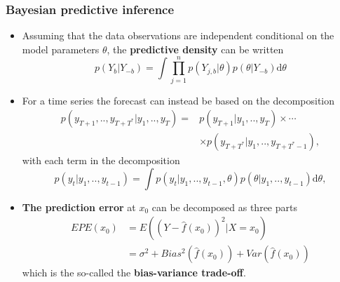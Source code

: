 \documentclass[10pt]{beamer}
\begin{document}
\begin{frame}
  \frametitle{Bayesian predictive inference}
  \begin{itemize}
  \item Assuming that the data observations are independent conditional on the
    model parameters $\theta$, the \textbf{predictive density} can be written
\[
p(Y_{b}|Y_{-b})=\int\prod_{j=1}^{n}p(Y_{j,b}|\theta)p(\theta|Y_{-b})\mathrm{d}\theta
\]

\item For a time series the forecast can instead be based on the
  decomposition
  \[
  \begin{split}
    p(y_{T+1},..,y_{T+T^{\ast}}|y_{1},..,y_{T})=&p(y_{T+1}|y_{1},..,y_{T})\times
    \cdots\\
    &\times p(y_{T+T^{\ast}}|y_{1},..,y_{T+T^{\ast}-1}),
  \end{split}
  \]
  with each term in the decomposition
  \[ p(y_{t}|y_{1},..,y_{t-1})=\int
  p(y_{t}|y_{1},..,y_{t-1},\theta)p(\theta|y_{1},..,y_{t-1})\mathrm{d}\theta,\]


  \item \textbf{The prediction error} at $x_0$ can be decomposed as three parts
    \begin{equation*}
      \begin{split}
        EPE(x_0) &= E((Y-\hat f(x_0))^2|X=x_0)\\
        &=\sigma^2 + Bias^2(\hat f(x_0)) + Var(\hat f(x_0))
      \end{split}
    \end{equation*}
    which is the so-called the \textbf{bias-variance trade-off}.

\end{itemize}

\end{frame}
\end{document}
